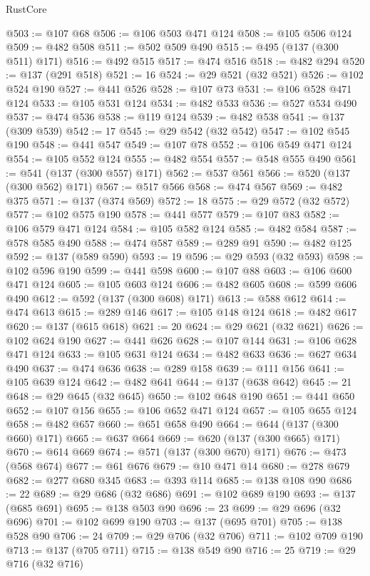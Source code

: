\begin{lexlean}{RustCore}
\begin{coremodule}
@503 := @107 @68
@506 := @106 @503 @471 @124
@508 := @105 @506 @124
@509 := @482 @508
@511 := @502 @509 @490
@515 := @495 (@137 (@300 @511) @171)
@516 := @492 @515
@517 := @474 @516
@518 := @482 @294
@520 := @137 (@291 @518)
@521 := 16
@524 := @29 @521 (@32 @521)
@526 := @102 @524 @190
@527 := @441 @526
@528 := @107 @73
@531 := @106 @528 @471 @124
@533 := @105 @531 @124
@534 := @482 @533
@536 := @527 @534 @490
@537 := @474 @536
@538 := @119 @124
@539 := @482 @538
@541 := @137 (@309 @539)
@542 := 17
@545 := @29 @542 (@32 @542)
@547 := @102 @545 @190
@548 := @441 @547
@549 := @107 @78
@552 := @106 @549 @471 @124
@554 := @105 @552 @124
@555 := @482 @554
@557 := @548 @555 @490
@561 := @541 (@137 (@300 @557) @171)
@562 := @537 @561
@566 := @520 (@137 (@300 @562) @171)
@567 := @517 @566
@568 := @474 @567
@569 := @482 @375
@571 := @137 (@374 @569)
@572 := 18
@575 := @29 @572 (@32 @572)
@577 := @102 @575 @190
@578 := @441 @577
@579 := @107 @83
@582 := @106 @579 @471 @124
@584 := @105 @582 @124
@585 := @482 @584
@587 := @578 @585 @490
@588 := @474 @587
@589 := @289 @91
@590 := @482 @125
@592 := @137 (@589 @590)
@593 := 19
@596 := @29 @593 (@32 @593)
@598 := @102 @596 @190
@599 := @441 @598
@600 := @107 @88
@603 := @106 @600 @471 @124
@605 := @105 @603 @124
@606 := @482 @605
@608 := @599 @606 @490
@612 := @592 (@137 (@300 @608) @171)
@613 := @588 @612
@614 := @474 @613
@615 := @289 @146
@617 := @105 @148 @124
@618 := @482 @617
@620 := @137 (@615 @618)
@621 := 20
@624 := @29 @621 (@32 @621)
@626 := @102 @624 @190
@627 := @441 @626
@628 := @107 @144
@631 := @106 @628 @471 @124
@633 := @105 @631 @124
@634 := @482 @633
@636 := @627 @634 @490
@637 := @474 @636
@638 := @289 @158
@639 := @111 @156
@641 := @105 @639 @124
@642 := @482 @641
@644 := @137 (@638 @642)
@645 := 21
@648 := @29 @645 (@32 @645)
@650 := @102 @648 @190
@651 := @441 @650
@652 := @107 @156
@655 := @106 @652 @471 @124
@657 := @105 @655 @124
@658 := @482 @657
@660 := @651 @658 @490
@664 := @644 (@137 (@300 @660) @171)
@665 := @637 @664
@669 := @620 (@137 (@300 @665) @171)
@670 := @614 @669
@674 := @571 (@137 (@300 @670) @171)
@676 := @473 (@568 @674)
@677 := @61 @676
@679 := @10 @471 @14
@680 := @278 @679
@682 := @277 @680 @345
@683 := @393 @114
@685 := @138 @108 @90
@686 := 22
@689 := @29 @686 (@32 @686)
@691 := @102 @689 @190
@693 := @137 (@685 @691)
@695 := @138 @503 @90
@696 := 23
@699 := @29 @696 (@32 @696)
@701 := @102 @699 @190
@703 := @137 (@695 @701)
@705 := @138 @528 @90
@706 := 24
@709 := @29 @706 (@32 @706)
@711 := @102 @709 @190
@713 := @137 (@705 @711)
@715 := @138 @549 @90
@716 := 25
@719 := @29 @716 (@32 @716)

\end{coremodule}
\end{lexlean}
